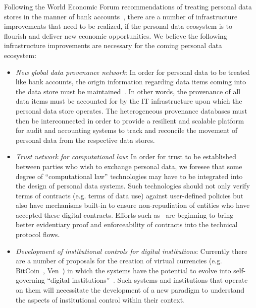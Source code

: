 Following the World Economic Forum recommendations of treating personal data stores in the manner
of bank accounts~\cite{WEF2011}, there are a number of infrastructure improvements that need
to be realized, if the personal data ecosystem is to flourish and deliver new economic opportunities.
We believe the following infrastructure improvements are necessary for the coming personal data ecosystem:

\begin{itemize}
\item  {\em New global data provenance network}:  In order for personal data to be treated
like bank accounts, the origin information regarding data items coming into the data store
must be maintained~\cite{HardjonoGreenwood2013}. 
In other words, the provenance of all data items must be
accounted for by the IT infrastructure upon which the personal data store operates.
The heterogeneous provenance databases must then be interconnected in order
to provide a resilient and scalable platform for audit and accounting systems
to track and reconcile the movement of personal data from the respective data stores.

\item  {\em Trust network for computational law}: In order for trust to be established between
parties who wish to exchange personal data, we foresee that some degree of ``computational law''
technologies may have to be integrated into the design of personal data systems.
Such technologies should not only verify terms of contracts (e.g. terms of data use) against user-defined policies
but also have mechanisms built-in to ensure non-repudiation of entities
who have accepted these digital contracts.
Efforts such as~\cite{UMAcore,UMABindingObligations} are beginning to bring better evidentiary proof and enforceability of contracts
into the technical protocol flows.

\item  {\em Development of institutional controls for digital institutions}:
Currently there are a number of proposals for the creation of virtual currencies (e.g. BitCoin~\cite{BarberBoyen2012}, Ven~\cite{Stalnaker2013})
in which the systems have the potential to evolve into self-governing ``digital institutions''~\cite{HardjonoDeegan2014}.
Such systems and institutions that operate on them will necessitate the development of a new paradigm
to understand the aspects of institutional control within their context.


\end{itemize}



